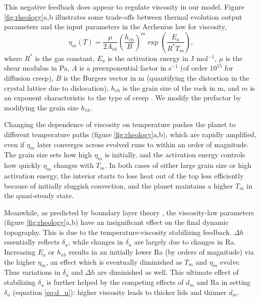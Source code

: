 This negative feedback does appear to regulate viscosity in our model. Figure \ref{fig:rheology}a,b illustrates some trade-offs between thermal evolution output parameters and the input parameters in the Arrhenius law for viscosity,
\begin{equation}\label{eq:eta_Arrhenius}
\eta_m(T) = \frac{\mu}{2 A_{rh}} \left(\frac{h_{rh}}{B}\right)^m \exp\left(\frac{E_a}{R^* T_m}\right),
\end{equation}
where $R^*$ is the gas constant, $E_a$ is the activation energy in J mol$^{-1}$, $\mu$ is the shear modulus in Pa, $A$ is a preexponential factor in s$^{-1}$ (of order $10^{15}$ for diffusion creep), $B$ is the Burgers vector in m (quantifying the distortion in the crystal lattice due to dislocation), $h_{rh}$ is the grain size of the rock in m, and $m$ is an exponent characteristic to the type of creep \citep{Karato1993}. We modify the prefactor by modifying the grain size $h_{rh}$.

Changing the dependence of viscosity on temperature pushes the planet to different temperature paths (figure \ref{fig:rheology}a,b), which are rapidly amplified, even if $\eta_m$ later converges across evolved runs to within an order of magnitude. The grain size sets how high $\eta_m$ is initially, and the activation energy controls how quickly $\eta_m$ changes with $T_m$. In both cases of either large grain size or high activation energy, the interior starts to lose heat out of the top less efficiently because of initially sluggish convection, and the planet maintains a higher $T_m$ in the quasi-steady state. 

Meanwhile, as predicted by boundary layer theory \citep{Solomatov1995, Solomatov2000, Reese2005}, the viscosity-law parameters (figure \ref{fig:rheology}a,b) have an insignificant effect on the final dynamic topography. This is due to the temperature-viscosity stabilizing feedback. $\Delta h$ essentially reflects $\delta_u$, while changes in $\delta_u$ are largely due to changes in Ra. Increasing $E_a$ or $h_{rh}$ results in an initially lower Ra (by orders of magnitude) via the higher $\eta_m$, an effect which is eventually diminished as $T_m$ and $\eta_m$ evolve. Thus variations in $\delta_u$ and $\Delta h$ are diminished as well. This ultimate effect of stabilizing $\delta_u$ is further helped by the competing effects of $d_m$ and Ra in setting $\delta_u$ (equation \ref{eq:d_u}): higher viscosity leads to thicker lids and thinner $d_m$.

